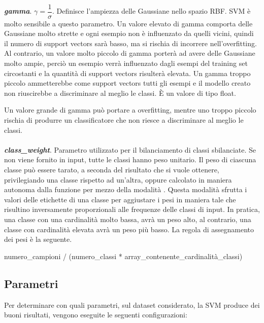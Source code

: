 \documentclass[12pt,a4paper,oneside,hidelinks]{report}
\begin{document}
\paragraph*{}
\textbf{\textit{gamma}}. $\gamma = \dfrac{1}{\sigma}$. Definisce l'ampiezza delle Gaussiane nello spazio RBF. SVM è molto sensibile a questo parametro. Un valore elevato di gamma comporta delle Gaussiane molto strette e ogni esempio non è influenzato da quelli vicini, quindi il numero di support vectors sarà basso, ma si rischia di incorrere nell'overfitting. Al contrario, un valore molto piccolo di gamma porterà ad avere delle Gaussiane molto ampie, perciò un esempio verrà influenzato dagli esempi del training set circostanti e la quantità di support vectors risulterà elevata. Un gamma troppo piccolo ammetterebbe come support vectors tutti gli esempi e il modello creato non riuscirebbe a discriminare al meglio le classi. È un valore di tipo float.

Un valore grande di gamma può portare a overfitting, mentre uno troppo piccolo rischia di produrre un classificatore che non riesce a discriminare al meglio le classi.

\paragraph*{}
\textbf{\textit{class\_weight}}. Parametro utilizzato per il bilanciamento di classi sbilanciate. Se non viene fornito in input, tutte le classi hanno peso unitario. Il peso di ciascuna classe può essere tarato, a seconda del risultato che si vuole ottenere, privilegiando una classe rispetto ad un'altra, oppure calcolato in maniera autonoma dalla funzione per mezzo della modalità . 
Questa modalità sfrutta i valori delle etichette di una classe per aggiustare i pesi in maniera tale che risultino inversamente proporzionali alle frequenze delle classi di input. In pratica, una classe con una cardinalità molto bassa, avrà un peso alto, al contrario, una classe con cardinalità elevata avrà un peso più basso. La regola di assegnamento dei pesi è la seguente.

\begin{center}
numero\_campioni / (numero\_classi * array\_contenente\_cardinalità\_classi)
\end{center}


\subsection{Parametri}
Per determinare con quali parametri, sul dataset considerato, la SVM produce dei buoni risultati, vengono eseguite le seguenti configurazioni:
\end{document}
